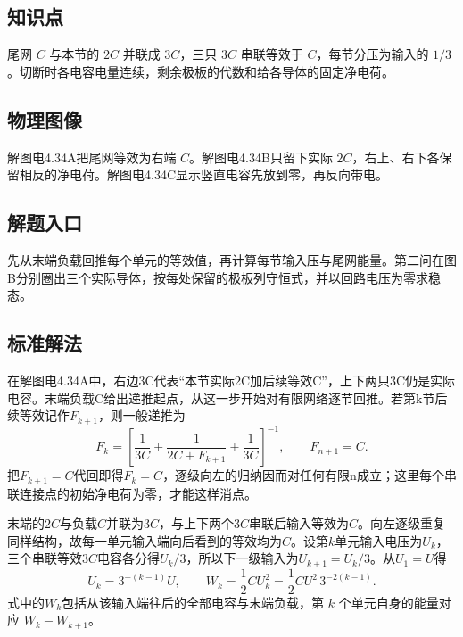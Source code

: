 \documentclass[UTF8,fontset=fandol,a4paper,11pt]{ctexart}
\begin{document}
\subsection*{知识点}

尾网 $C$ 与本节的 $2C$ 并联成 $3C$，三只 $3C$ 串联等效于 $C$，每节分压为输入的 $1/3$。切断时各电容电量连续，剩余极板的代数和给各导体的固定净电荷。



\subsection*{物理图像}

解图电4.34A把尾网等效为右端 $C$。解图电4.34B只留下实际 $2C$，右上、右下各保留相反的净电荷。解图电4.34C显示竖直电容先放到零，再反向带电。



\subsection*{解题入口}

先从末端负载回推每个单元的等效值，再计算每节输入压与尾网能量。第二问在图B分别圈出三个实际导体，按每处保留的极板列守恒式，并以回路电压为零求稳态。


\subsection*{标准解法}

在解图电4.34A中，右边3C代表“本节实际2C加后续等效C”，上下两只3C仍是实际电容。末端负载C给出递推起点，从这一步开始对有限网络逐节回推。若第k节后续等效记作$F_{k+1}$，则一般递推为
\[
F_k=\left[\frac1{3C}+\frac1{2C+F_{k+1}}+\frac1{3C}\right]^{-1},\qquad F_{n+1}=C.
\]
把$F_{k+1}=C$代回即得$F_k=C$，逐级向左的归纳因而对任何有限n成立；这里每个串联连接点的初始净电荷为零，才能这样消点。

末端的$2C$与负载$C$并联为$3C$，与上下两个$3C$串联后输入等效为$C$。向左逐级重复同样结构，故每一单元输入端向后看到的等效均为$C$。设第$k$单元输入电压为$U_k$，三个串联等效$3C$电容各分得$U_k/3$，所以下一级输入为$U_{k+1}=U_k/3$。从$U_1=U$得
\[
U_k=3^{-(k-1)}U,\qquad
\boxed{W_k=\frac12CU_k^2=\frac12CU^2\,3^{-2(k-1)}}.
\]
式中的$W_k$包括从该输入端往后的全部电容与末端负载，第 $k$ 个单元自身的能量对应 $W_k-W_{k+1}$。
\end{document}
